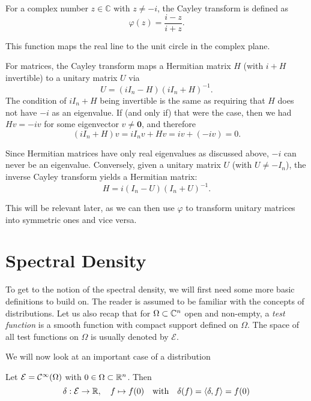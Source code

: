 For a complex number $z \in \mathbb{C}$ with $z \neq -i$, the Cayley transform is defined as
\[
\varphi(z) = \frac{i - z}{i + z}.
\]

This function maps the real line to the unit circle in the complex plane.

\vspace{0.5cm}



For matrices, the Cayley transform maps a Hermitian matrix $H$ (with $i + H$ invertible) to a unitary matrix $U$ via
\[
U = (i I_n - H)(i I_n + H)^{-1}.
\]
The condition of $i I_n + H$ being invertible is the same as requiring that $H$ does not have $-i$ as an eigenvalue. If (and only if) that were the case, then we had $H v = -i v$ for some eigenvector $v \neq \mathbf{0}$, and therefore
\[
(i I_n + H) v = i I_n v + H v = i v + (-i v) = 0.
\]

Since Hermitian matrices have only real eigenvalues as discussed above, $-i$ can never be an eigenvalue. Conversely, given a unitary matrix $U$ (with $U \neq -I_n$), the inverse Cayley transform yields a Hermitian matrix:
\[
H = i (I_n - U)(I_n + U)^{-1}.
\]

This will be relevant later, as we can then use $\varphi$ to transform unitary matrices into symmetric ones and vice versa.

\section{Spectral Density}

To get to the notion of the spectral density, we will first need some more basic definitions to build on. The reader is assumed to be familiar with the concepts of distributions. Let us also recap that for $\Omega \subset \mathbb{C}^n$ open and non-empty, a \emph{test function} is a smooth function with compact support defined on $\Omega$. The space of all test functions on $\Omega$ is usually denoted by $\mathcal{E}$.

We will now look at an important case of a distribution

\begin{definition}
    Let $\mathcal{E} = \mathcal{C}^{\infty}(\Omega)$ with $0 \in \Omega \subset \mathbb{R}^n$.
    Then
    \[
    \delta: \mathcal{E} \to \mathbb{R}, \quad f \mapsto f(0) \quad \text{with} \quad \delta(f) = \langle \delta, f \rangle = f(0)
    \]
\end{definition}

